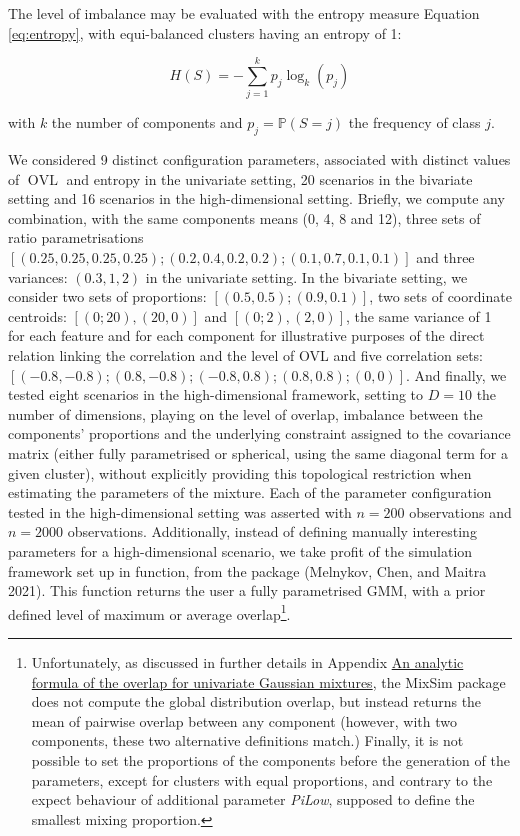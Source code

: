 The level of imbalance may be evaluated with the entropy measure Equation \eqref{eq:entropy}, with equi-balanced clusters having an entropy of 1:

\begin{equation}
    H(S)=-\sum_{j=1}^k p_j \log_k (p_j)
\label{eq:entropy}
\end{equation}

with \(k\) the number of components and \(p_j=\mathbb{P}(S=j)\) the frequency of class \(j\).

We considered 9 distinct configuration parameters, associated with distinct values of \(\operatorname{OVL}\) and entropy in the univariate setting, 20 scenarios in the bivariate setting and 16 scenarios in the high-dimensional setting. Briefly, we compute any combination, with the same components means (0, 4, 8 and 12), three sets of ratio parametrisations \(\left[(0.25, 0.25, 0.25, 0.25); (0.2, 0.4, 0.2, 0.2); (0.1, 0.7, 0.1, 0.1) \right]\) and three variances: \((0.3, 1, 2)\) in the univariate setting. In the bivariate setting, we consider two sets of proportions: \(\left[(0.5, 0.5); (0.9, 0.1) \right]\), two sets of coordinate centroids: \(\left[(0; 20), (20, 0) \right]\) and \(\left[(0; 2), (2, 0) \right]\), the same variance of 1 for each feature and for each component for illustrative purposes of the direct relation linking the correlation and the level of OVL and five correlation sets: \(\left[(-0.8, -0.8); (0.8, -0.8); (-0.8, 0.8); (0.8, 0.8); (0, 0)\right]\).
\color{green}And finally, we tested eight scenarios in the high-dimensional framework, setting to \(D=10\) the number of dimensions, playing on the level of overlap, imbalance between the components' proportions and the underlying constraint assigned to the covariance matrix (either fully parametrised or spherical, using the same diagonal term for a given cluster), without explicitly providing this topological restriction when estimating the parameters of the mixture. Each of the parameter configuration tested in the high-dimensional setting was asserted with \(n=200\) observations and \(n=2000\) observations. Additionally, instead of defining manually interesting parameters for a high-dimensional scenario, we take profit of the simulation framework set up in  function, from the  package (Melnykov, Chen, and Maitra 2021). This function returns the user a fully parametrised GMM, with a prior defined level of maximum or average overlap\footnote{Unfortunately, as discussed in further details in Appendix \protect\hyperlink{an-analytic-formula-of-the-overlap-for-univariate-gaussian-mixtures}{An analytic formula of the overlap for univariate Gaussian mixtures}, the MixSim package does not compute the global distribution overlap, but instead returns the mean of pairwise overlap between any component (however, with two components, these two alternative definitions match.) Finally, it is not possible to set the proportions of the components before the generation of the parameters, except for clusters with equal proportions, and contrary to the expect behaviour of additional parameter \emph{PiLow}, supposed to define the smallest mixing proportion.}.
\color{black}

